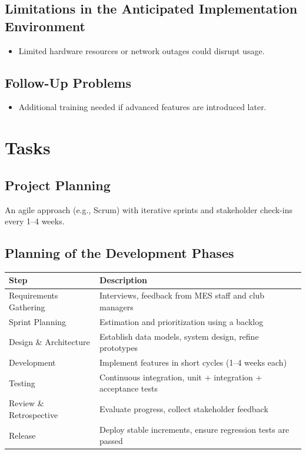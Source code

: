 \documentclass[12pt]{article}
\begin{document}
\subsection{Limitations in the Anticipated Implementation Environment}
\begin{itemize}
    \item Limited hardware resources or network outages could disrupt usage.
\end{itemize}

\subsection{Follow-Up Problems}
\begin{itemize}
    \item Additional training needed if advanced features are introduced later.
\end{itemize}

\section{Tasks}
\subsection{Project Planning}
An agile approach (e.g., Scrum) with iterative sprints and stakeholder check-ins every 1--4 weeks.

\subsection{Planning of the Development Phases}
\begin{longtable}{| m{3cm} | m{10cm} |}
  \hline
  \textbf{Step} & \textbf{Description} \\
  \hline
  Requirements Gathering & Interviews, feedback from MES staff and club managers \\
  \hline
  Sprint Planning & Estimation and prioritization using a backlog \\
  \hline
  Design \& Architecture & Establish data models, system design, refine prototypes \\
  \hline
  Development & Implement features in short cycles (1--4 weeks each) \\
  \hline
  Testing & Continuous integration, unit + integration + acceptance tests \\
  \hline
  Review \& Retrospective & Evaluate progress, collect stakeholder feedback \\
  \hline
  Release & Deploy stable increments, ensure regression tests are passed \\
  \hline
\end{longtable}
\end{document}
